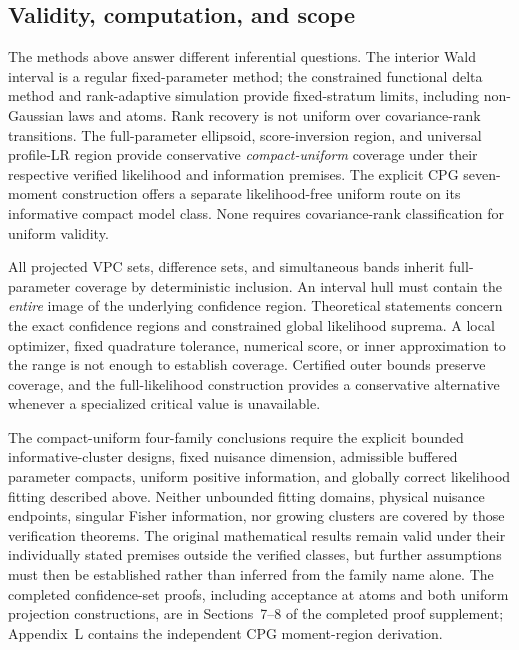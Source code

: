 \subsection{Validity, computation, and scope}
\label{subsec:ci-scope}

The methods above answer different inferential questions.
The interior Wald interval is a regular fixed-parameter method;
the constrained functional delta method and rank-adaptive simulation
provide fixed-stratum limits, including non-Gaussian laws and atoms.
Rank recovery is not uniform over covariance-rank transitions.
The full-parameter ellipsoid, score-inversion region, and universal
profile-LR region provide conservative \emph{compact-uniform} coverage
under their respective verified likelihood and information premises.
The explicit CPG seven-moment construction offers a separate
likelihood-free uniform route on its informative compact model class.
None requires covariance-rank classification for uniform validity.

All projected VPC sets, difference sets, and simultaneous bands inherit
full-parameter coverage by deterministic inclusion. An interval hull
must contain the \emph{entire} image of the underlying confidence
region. Theoretical statements concern the exact confidence regions
and constrained global likelihood suprema. A local optimizer, fixed
quadrature tolerance, numerical score, or inner approximation to the
range is not enough to establish coverage. Certified outer bounds
preserve coverage, and the full-likelihood construction provides a
conservative alternative whenever a specialized critical value is
unavailable.

The compact-uniform four-family conclusions require the explicit
bounded informative-cluster designs, fixed nuisance dimension,
admissible buffered parameter compacts, uniform positive information,
and globally correct likelihood fitting described above. Neither
unbounded fitting domains, physical nuisance endpoints, singular
Fisher information, nor growing clusters are covered by those
verification theorems. The original mathematical results remain
valid under their individually stated premises outside the verified
classes, but further assumptions must then be established rather
than inferred from the family name alone. The completed confidence-set
proofs, including acceptance at atoms and both uniform projection
constructions, are in Sections~7--8 of the completed proof supplement;
Appendix~L contains the independent CPG moment-region derivation.
